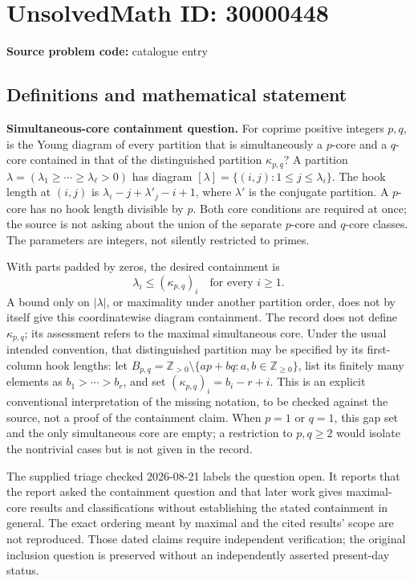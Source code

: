 \documentclass[11pt]{article}
\newcommand{\Z}{\mathbb{Z}}
\begin{document}
\section*{UnsolvedMath ID: 30000448}
\textbf{Source problem code:} catalogue entry
\subsection{Definitions and mathematical statement}
\textbf{Simultaneous-core containment question.} For coprime positive integers \(p,q\), is the Young diagram of every partition that is simultaneously a \(p\)-core and a \(q\)-core contained in that of the distinguished partition \(\kappa_{p,q}\)? A partition \(\lambda=(\lambda_1\ge\cdots\ge\lambda_\ell>0)\) has diagram \([\lambda]=\{(i,j):1\le j\le\lambda_i\}\). The hook length at \((i,j)\) is \(\lambda_i-j+\lambda'_j-i+1\), where \(\lambda'\) is the conjugate partition. A \(p\)-core has no hook length divisible by \(p\). Both core conditions are required at once; the source is not asking about the union of the separate \(p\)-core and \(q\)-core classes. The parameters are integers, not silently restricted to primes.\par With parts padded by zeros, the desired containment is\[\lambda_i\le(\kappa_{p,q})_i\quad\text{for every }i\ge1.\] A bound only on \(|\lambda|\), or maximality under another partition order, does not by itself give this coordinatewise diagram containment. The record does not define \(\kappa_{p,q}\); its assessment refers to the maximal simultaneous core. Under the usual intended convention, that distinguished partition may be specified by its first-column hook lengths: let \(B_{p,q}=\Z_{>0}\setminus\{ap+bq:a,b\in\Z_{\ge0}\}\), list its finitely many elements as \(b_1>\cdots>b_r\), and set \((\kappa_{p,q})_i=b_i-r+i\). This is an explicit conventional interpretation of the missing notation, to be checked against the source, not a proof of the containment claim. When \(p=1\) or \(q=1\), this gap set and the only simultaneous core are empty; a restriction to \(p,q\ge2\) would isolate the nontrivial cases but is not given in the record.\par The supplied triage checked 2026-08-21 labels the question open. It reports that the report asked the containment question and that later work gives maximal-core results and classifications without establishing the stated containment in general. The exact ordering meant by maximal and the cited results' scope are not reproduced. Those dated claims require independent verification; the original inclusion question is preserved without an independently asserted present-day status.
\end{document}
